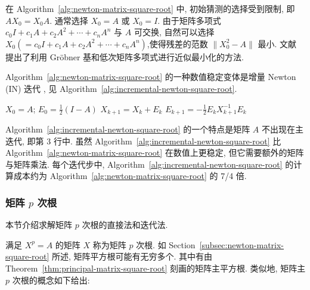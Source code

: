 {在 Algorithm~\ref{alg:newton-matrix-square-root} 中, 初始猜测的选择受到限制, 即 $AX_0=X_0A$. 通常选择 $X_0=A$ 或 $X_0=I$. 由于矩阵多项式 $c_0I+c_1A+c_2A^2+\cdots+c_nA^n$ 与 $A$ 可交换, 自然可以选择\newline{}$X_0(=c_0I+c_1A+c_2A^2+\cdots+c_nA^n)$,\newline{}使得残差的范数 $\|X_0^2-A\|$ 最小. 文献  提出了利用 Gröbner 基和低次矩阵多项式进行近似最小化的方法.}

{Algorithm~\ref{alg:newton-matrix-square-root} 的一种数值稳定变体是增量 Newton (IN) 迭代 , 见 Algorithm~\ref{alg:incremental-newton-square-root}.}

\begin{algorithm}[H]\caption{{(迭代法) 求 $X=A^{1/2}$ 的 IN 方法}}\label{alg:incremental-newton-square-root}\begin{algorithmic}[1]
\State $X_0=A$; $E_0=\frac{1}{2}(I-A)$
\State $X_{k+1}=X_k+E_k$
\State $E_{k+1}=-\frac{1}{2}E_kX_{k+1}^{-1}E_k$
\EndFor
\end{algorithmic}\end{algorithm}

{Algorithm~\ref{alg:incremental-newton-square-root} 的一个特点是矩阵 $A$ 不出现在主迭代, 即第 3 行中. 虽然 Algorithm~\ref{alg:incremental-newton-square-root} 比 Algorithm~\ref{alg:newton-matrix-square-root} 在数值上更稳定, 但它需要额外的矩阵与矩阵乘法. 每个迭代步中, Algorithm~\ref{alg:incremental-newton-square-root} 的计算成本约为 Algorithm~\ref{alg:newton-matrix-square-root} 的 7/4 倍.}

\subsubsection{{矩阵 $p$ 次根}}\label{subsec:matrix-pth-root}

{本节介绍求解矩阵 $p$ 次根的直接法和迭代法.}

{满足 $X^p=A$ 的矩阵 $X$ 称为矩阵 $p$ 次根. 如 Section~\ref{subsec:newton-matrix-square-root} 所述, 矩阵平方根可能有无穷多个. 其中有由 Theorem~\ref{thm:principal-matrix-square-root} 刻画的矩阵主平方根. 类似地, 矩阵主 $p$ 次根的概念如下给出:}

